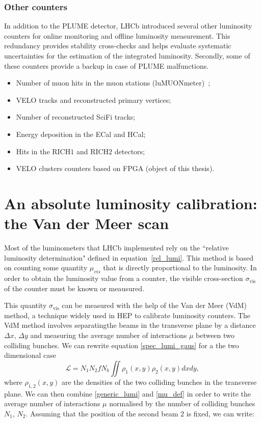 \subsubsection{Other counters} 
In addition to the PLUME detector, LHCb introduced several other luminosity counters for online monitoring and offline luminosity measurement. This redundancy provides stability cross-checks and helps evaluate systematic uncertainties for the estimation of the integrated luminosity.
Secondly, some of these counters provide a backup in case of PLUME malfunctions.
\begin{itemize}
   \item Number of muon hits in the muon stations (luMUONmeter)~\cite{Albicocco:2812716};
   \item VELO tracks and reconstructed primary vertices;
   \item Number of reconstructed SciFi tracks;
   \item Energy deposition in the ECal and HCal;
    \item Hits in the RICH$1$ and RICH$2$ detectors;
    \item VELO clusters counters based on FPGA (object of this thesis).

\end{itemize}


\section{An absolute luminosity calibration: the Van der Meer scan}
Most of the luminometers that LHCb implemented rely on the ``relative luminosity determination" defined in equation~\eqref{rel_lumi}. This method is based on counting some quantity $\mu_{vis}$ that is directly proportional to the luminosity. In order to obtain the luminosity value from a counter, the visible cross-section $\sigma_{\text{vis}}$ of the counter must be known or meausured.

This quantity $\sigma_{\text{vis}}$ can be measured with the help of the Van der Meer (VdM) method, a technique widely used in HEP to calibrate luminosity counters. The VdM method involves separatingthe beams in the transverse plane by a distance $\Delta x$, $\Delta y$ and measuring the average number of interactions $\mu$ between two colliding bunches. 
We can rewrite equation \eqref{spec_lumi_gaus} for a the two dimensional case
\begin{equation}
    \mathcal{L} = N_1 N_2 f N_b\iint \rho_1(x,y) \rho_2(x,y) dxdy,\label{generic_lumi}
\end{equation}
where $\rho_{1,2}(x,y)$ are the densities of the two colliding bunches in the transverse plane.
We can then combine \eqref{generic_lumi} and \eqref{mu_def} in order to write the average number of interactions $\mu$ normalised by the number of colliding bunches $N_1$, $N_2$. Assuming that the position of the second beam $2$ is fixed, we can write:

